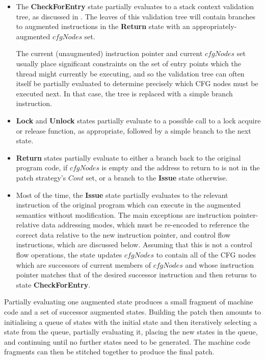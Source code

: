 \begin{itemize}
\item The \textbf{CheckForEntry} state partially evaluates to a stack
  context validation tree, as discussed in .  The leaves of
  this validation tree will contain branches to augmented instructions
  in the \textbf{Return} state with an appropriately-augmented
  $\mathit{cfgNodes}$ set.

  The current (unaugmented) instruction pointer and current $\mathit{cfgNodes}$
  set usually place significant constraints on the set of entry points
  which the thread might currently be executing, and so the validation
  tree can often itself be partially evaluated to determine precisely
  which CFG nodes must be executed next.  In that case, the tree is
  replaced with a simple branch instruction.
\item \textbf{Lock} and \textbf{Unlock} states partially evaluate to a
  possible call to a lock acquire or release function, as appropriate,
  followed by a simple branch to the next state.
\item \textbf{Return} states partially evaluate to either a branch
  back to the original program code, if $\mathit{cfgNodes}$ is empty and the
  address to return to is not in the patch strategy's $Cont$ set, or a
  branch to the \textbf{Issue} state otherwise.
\item Most of the time, the \textbf{Issue} state partially evaluates
  to the relevant instruction of the original program which can
  execute in the augmented semantics without modification.  The main
  exceptions are instruction pointer-relative data addressing modes,
  which must be re-encoded to reference the correct data relative to
  the new instruction pointer, and control flow instructions, which
  are discussed below.  Assuming that this is not a control flow
  operations, the state updates $\mathit{cfgNodes}$ to contain all of the CFG
  nodes which are successors of current members of $\mathit{cfgNodes}$ and
  whose instruction pointer matches that of the desired successor
  instruction and then returns to state \textbf{CheckForEntry}.
\end{itemize}

Partially evaluating one augmented state produces a small fragment of
machine code and a set of successor augmented states.  Building the
patch then amounts to initialising a queue of states with the initial
state and then iteratively selecting a state from the queue, partially
evaluating it, placing the new states in the queue, and continuing
until no further states need to be generated.  The machine code
fragments can then be stitched together to produce the final patch.

